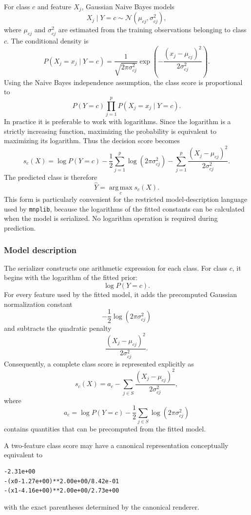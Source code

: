 For class \(c\) and feature \(X_j\), Gaussian Naive Bayes models
\[
X_j\mid Y=c \sim \mathcal{N}(\mu_{cj},\sigma_{cj}^2),
\]
where $\mu_{cj}$ and $\sigma_{cj}^2$ are estimated from the training observations belonging to class $c$. The conditional density is
\[
P(X_j=x_j\mid Y=c) = \frac{1}{\sqrt{2\pi\sigma_{cj}^{2}}}
\exp\left(-\frac{(x_j-\mu_{cj})^2}{2\sigma_{cj}^{2}} \right).
\]
Using the Naive Bayes independence assumption, the class score is proportional to
\[
P(Y=c) \prod_{j=1}^{p} P(X_j=x_j\mid Y=c).
\]
In practice it is preferable to work with logarithms. Since the logarithm is a strictly increasing function, maximizing the probability is equivalent to maximizing its logarithm. Thus the decision score becomes
\[
s_c(X) = \log P(Y=c) - \frac{1}{2}
\sum_{j=1}^{p} \log\left(2\pi\sigma_{cj}^{2}\right) - \sum_{j=1}^{p}
\frac{(X_j-\mu_{cj})^2}{2\sigma_{cj}^{2}}.
\]
The predicted class is therefore
\[
\widehat{Y} = \operatorname*{arg\,max}_c s_c(X).
\]
This form is particularly convenient for the restricted model-description language used by \texttt{mnplib}, because the logarithms of the fitted constants can be calculated when the model is serialized. No logarithm operation is required during prediction.

\subsubsection{Model description}

The serializer constructs one arithmetic expression for each class. For class $c$, it begins with the logarithm of the fitted prior:
\[
\log P(Y=c).
\]
For every feature used by the fitted model, it adds the precomputed Gaussian normalization constant
\[
-\frac{1}{2} \log\left(2\pi\sigma_{cj}^{2}\right)
\]
and subtracts the quadratic penalty
\[
\frac{(X_j-\mu_{cj})^2}
     {2\sigma_{cj}^{2}}.
\]
Consequently, a complete class score is represented explicitly as
\[
s_c(X) = a_c - \sum_{j\in S}
\frac{(X_j-\mu_{cj})^2}
     {2\sigma_{cj}^{2}},
\]
where
\[
a_c = \log P(Y=c) - \frac{1}{2} \sum_{j\in S}
\log\left(2\pi\sigma_{cj}^{2}\right)
\]
contains quantities that can be precomputed from the fitted model.

\begin{example}
A two-feature class score may have a canonical representation conceptually equivalent to

\begin{verbatim}
-2.31e+00
-(x0-1.27e+00)**2.00e+00/8.42e-01
-(x1-4.16e+00)**2.00e+00/2.73e+00
\end{verbatim}

with the exact parentheses determined by the canonical renderer.
\end{example}

